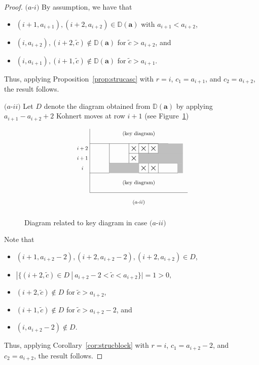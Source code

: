 \documentclass[letterpaper,10pt]{article}
\begin{document}
\begin{proof}
    $(a$-$i)$ By assumption, we have that
    \begin{itemize}
        \item $(i+1,a_{i+1}),(i+2,a_{i+2})\in \mathbb{D}(\mathbf{a})$ with $a_{i+1}<a_{i+2}$,
        \item $(i,a_{i+2}),(i+2,\tilde{c})\notin \mathbb{D}(\mathbf{a})$ for $\tilde{c}>a_{i+2}$, and
        \item $(i,a_{i+1}),(i+1,\tilde{c})\notin \mathbb{D}(\mathbf{a})$ for $\tilde{c}>a_{i+1}$.
    \end{itemize}
    Thus, applying Proposition~\ref{prop:strucasc} with $r=i$, $c_1=a_{i+1}$, and $c_2=a_{i+2}$, the result follows.

    $(a$-$ii)$ Let $D$ denote the diagram obtained from $\mathbb{D}(\mathbf{a})$ by applying $a_{i+1}-a_{i+2}+2$ Kohnert moves at row $i+1$ (see Figure~\ref{fig:key1aii})
    \begin{figure}[H]
        \centering
        $$\scalebox{0.75}{\begin{tikzpicture}[scale=0.65]
        \node at (-0.75,4.5) {$i+2$};
    \node at (-0.75,3.5) {$i+1$};
    \node at (-0.75,2.5) {$i$};
    \draw (0,2)--(2,2)--(2,5)--(0,5);
    \draw (2,3)--(4,3)--(4,5)--(2,5);
    \draw (4,3)--(5,3)--(5,5)--(4,5);
    \draw (5,4)--(6,4)--(6,5)--(5,5);
    \draw (6,4)--(7,4)--(7,5)--(6,5);
    \draw (7,2)--(9,2)--(9,3)--(7,3);
    \draw (0,6.5)--(0,0)--(10,0);
    \draw (5,2)--(7,2)--(7,3)--(5,3)--(5,2);
    \draw (6,2)--(6,3);
    \draw (4,4)--(5,4);
    \draw (5,4)--(7,4)--(7,5)--(5,5);
    \draw (7,4)--(8,4)--(8,5)--(7,5);
    \node at (4.5,3.5) {$\bigtimes$};
    \node at (4.5,4.5) {$\bigtimes$};
    \node at (5.5,2.5) {$\bigtimes$};
    \node at (5.5,4.5) {$\bigtimes$};
    \node at (6.5,2.5) {$\bigtimes$};
    \node at (6.5,4.5) {$\bigtimes$};
    \filldraw[draw=lightgray,fill=lightgray] (2,2) rectangle (5,3);
    \filldraw[draw=lightgray,fill=lightgray] (9,2) rectangle (9.5,3);
    \filldraw[draw=lightgray,fill=lightgray] (5,3) rectangle (9.5,4);
    \filldraw[draw=lightgray,fill=lightgray] (7,4) rectangle (9.5,5);
    \node at (5,6) {(key diagram)};
    \node at (5,1) {(key diagram)};
    \node at (5,-1) {$(a$-$ii)$};
\end{tikzpicture}}$$
        \caption{Diagram related to key diagram in case $(a$-$ii)$}
        \label{fig:key1aii}
    \end{figure}
    Note that
    \begin{itemize}
        \item $(i+1,a_{i+2}-2),(i+2,a_{i+2}-2),(i+2,a_{i+2})\in D$,
        \item $|\{(i+2,\tilde{c})\in D~|~a_{i+2}-2<\tilde{c}<a_{i+2}\}|=1>0,$
        \item $(i+2,\tilde{c})\notin D$ for $\tilde{c}>a_{i+2}$,
        \item $(i+1,\tilde{c})\notin D$ for $\tilde{c}>a_{i+2}-2$, and
        \item $(i,a_{i+2}-2)\notin D$.
    \end{itemize}
    Thus, applying Corollary~\ref{cor:strucblock} with $r=i$, $c_1=a_{i+2}-2$, and $c_2=a_{i+2}$, the result follows.


\end{proof}
\end{document}
